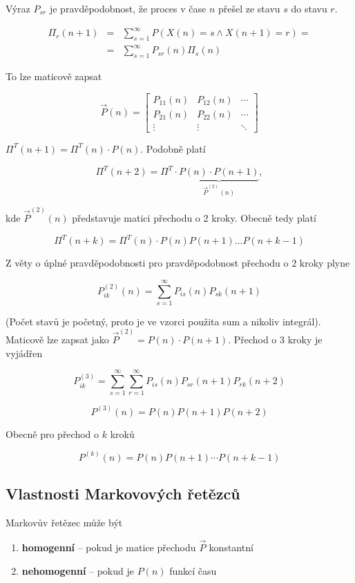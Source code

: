 Výraz $P_{sr}$ je pravděpodobnost, že proces v čase $n$ přešel ze stavu $s$ do stavu $r$.

\begin{eqnarray*}
\Pi_r(n+1) & = & \sum_{s=1}^\infty P(X(n)=s\wedge X(n+1)=r) =\\
& = & \sum_{s=1}^\infty P_{sr}(n)\Pi_s(n)
\end{eqnarray*}

To lze maticově zapsat

\[ \vec{P}(n) =
\begin{bmatrix}
P_{11}(n) & P_{12}(n) & \cdots\\
P_{21}(n) & P_{22}(n) & \cdots\\
\vdots & \vdots & \ddots
\end{bmatrix} \]

$\Pi^T(n+1)= \Pi^T(n)\cdot P(n)$. Podobně platí 

\[ \Pi^T(n+2)=\Pi^T\cdot \underbrace{P(n)\cdot P(n+1)}_{\vec{P}^{(2)}(n)}, \]

kde $\vec{P}^{(2)}(n)$ představuje matici přechodu o 2 kroky. Obecně tedy platí

\[ \Pi^T(n+k)=\Pi^T(n)\cdot P(n)P(n+1)\ldots P(n+k-1) \]

Z věty o úplné pravděpodobnosti pro pravděpodobnost přechodu o 2 kroky plyne

\[ P_{ik}^{(2)}(n) = \sum_{s=1}^\infty P_{is}(n)P_{sk}(n+1) \]

(Počet stavů je početný, proto je ve vzorci použita sum a nikoliv integrál). Maticově lze zapsat jako $\vec{P}^{(2)}=P(n)\cdot P(n+1)$. Přechod o 3 kroky je vyjádřen

\[ P_{ik}^{(3)} = \sum_{s=1}^\infty \sum_{r=1}^\infty P_{is}(n)P_{sr}(n+1)P_{rk}(n+2) \]

\[ P^{(3)}(n)=P(n)P(n+1)P(n+2) \]

Obecně pro přechod o $k$ kroků

\[ P^{(k)}(n)=P(n)P(n+1)\cdots P(n+k-1) \]

\subsection{Vlastnosti Markovových řetězců}
Markovův řetězec může být

\begin{enumerate}[noitemsep]
\item \textbf{homogenní} -- pokud je matice přechodu $\vec{P}$ konstantní
\item \textbf{nehomogenní} -- pokud je $P(n)$ funkcí času
\end{enumerate}

